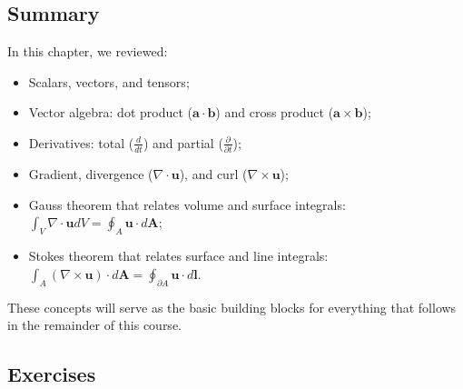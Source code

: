 \documentclass[12pt]{article}
\numberwithin{equation}{section}
\numberwithin{figure}{section}
\numberwithin{table}{section}
\begin{document}
\subsection{Summary}

In this chapter, we reviewed:

\begin{itemize}
  \item Scalars, vectors, and tensors;
  \item Vector algebra: dot product ($\mathbf{a} \cdot \mathbf{b}$) and cross
  product ($\mathbf{a} \times \mathbf{b}$);
  \item Derivatives: total ($\frac{d}{dt}$) and partial ($\frac{\partial}{\partial t}$);
  \item Gradient, divergence ($\nabla \cdot \mathbf{u}$), and curl ($\nabla \times \mathbf{u}$);
  \item Gauss theorem that relates volume and surface integrals:
  $\int_V \nabla \cdot \mathbf{u} dV = \oint_A \mathbf{u} \cdot d\mathbf{A}$;
  \item Stokes theorem that relates surface and line integrals:
  $\int_A (\nabla \times \mathbf{u}) \cdot d\mathbf{A} = \oint_{\partial A} \mathbf{u} \cdot d\mathbf{l}$.
\end{itemize}

These concepts will serve as the basic building blocks for everything that
follows in the remainder of this course.

\subsection{Exercises}
\end{document}
